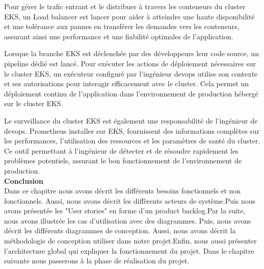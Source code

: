 Pour gérer le trafic entrant et le distribuer à travers les conteneurs du cluster EKS, un Load balancer est lancer pour aider à atteindre une haute disponibilité et une tolérance aux pannes en transférer les demandes vers les conteneurs, assurant ainsi une performance et une fiabilité optimales de l’application.
\\[0.01cm]
\indent
{}  
Lorsque la branche EKS est déclenchée par des développeurs  leur code source, un pipeline dédié est lancé. Pour exécuter les actions de déploiement nécessaires sur le cluster EKS, un exécuteur configuré par l’ingénieur devops utilise son contexte et ses autorisations pour interagir efficacement avec le cluster. Cela permet un déploiement continu de l’application dans l’environnement de production hébergé sur le cluster EKS.
\\[0.01cm]
\indent
{}  
Le surveillance du cluster EKS est également une responsabilité de l’ingénieur de devops. Prometheus installer sur EKS, fournissent des informations complètes sur les performances, l’utilisation des ressources et les paramètres de santé du cluster. Ce outil permettant à l’ingénieur de détecter et de résoudre rapidement les problèmes potentiels, assurant le bon fonctionnement de l’environnement de production.\\[0.3cm]
          
\textbf{\huge Conclusion}\\[0.5cm] 

Dans ce chapitre nous avons décrit les différents besoins fonctionnels et non fonctionnels. Aussi, nous avons décrit les diffèrents acteurs de système.Puis nous avons présentée les "User stories" en forme d'un product backlog.Par la suite, nous avons illustrée les cas d'utilisation avec des diagrammes. Puis, nous avons décrit les différents diagrammes de conception. Aussi, nous avons décrit la méthodologie de conception utiliser dans notre projet.Enfin, nous aussi présenter l'architecture global qui expliquer la fonctionnement du projet. Dans le chapitre suivante nous passerons à la phase de réalisation du projet.



